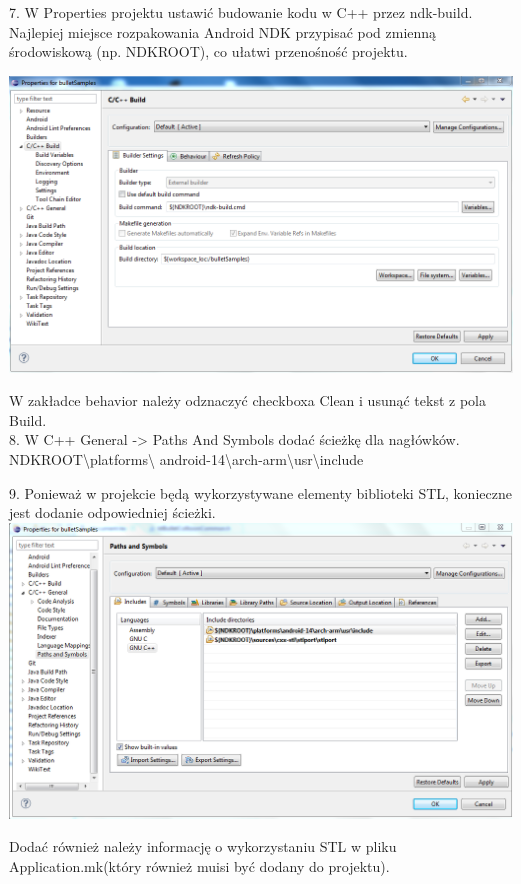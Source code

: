 \documentclass[12pt]{article}
\begin{document}
  7. W Properties projektu ustawić budowanie kodu w C++ przez ndk-build.
  Najlepiej miejsce rozpakowania Android NDK przypisać pod zmienną środowiskową
  (np. NDKROOT), co ułatwi przenośność projektu.
  
  \includegraphics[width=\textwidth]{./img/properties.png}
  
  W zakładce behavior należy odznaczyć checkboxa Clean i usunąć tekst z pola
  Build.\\
  8. W C++ General -> Paths And Symbols dodać ścieżkę dla nagłówków.
  {NDKROOT}\backslash platforms\backslash
  android-14\backslash arch-arm\backslash usr\backslash include
  
  9. Ponieważ w projekcie będą wykorzystywane elementy biblioteki STL, konieczne
  jest dodanie odpowiedniej ścieżki.\\
  
  \includegraphics[width=\textwidth]{./img/ndkroot.png}
  
  Dodać również należy informację o wykorzystaniu STL w pliku
  Application.mk(który również muisi być dodany do projektu).
  
\end{document}
